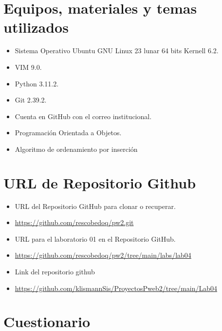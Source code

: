 \documentclass{article}
\begin{document}
	\section{Equipos, materiales y temas utilizados}
	\begin{itemize}
		\item Sistema Operativo Ubuntu GNU Linux 23 lunar 64 bits Kernell 6.2.
		\item VIM 9.0.
		\item Python 3.11.2.
		\item Git 2.39.2.
		\item Cuenta en GitHub con el correo institucional.
		\item Programación Orientada a Objetos.
		\item Algoritmo de ordenamiento por inserción	
	\end{itemize}
	
	\section{URL de Repositorio Github}
	\begin{itemize}
		\item URL del Repositorio GitHub para clonar o recuperar.
		\item \url{https://github.com/rescobedoq/pw2.git}
		\item URL para el laboratorio 01 en el Repositorio GitHub.
		\item \url{https://github.com/rescobedoq/pw2/tree/main/labs/lab04}
	\end{itemize}
		
	\begin{itemize}	
		\item Link del repositorio github
        \item \url{https://github.com/klismannSis/ProyectosPweb2/tree/main/Lab04}
	\end{itemize}

\section{Cuestionario}
\end{document}

